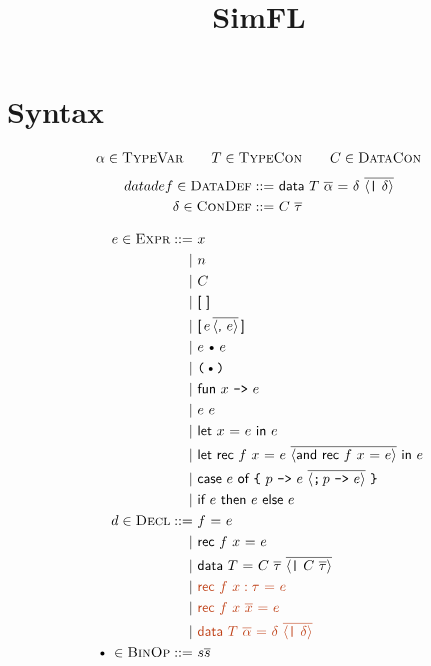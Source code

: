 \documentclass{article}
\title{SimFL}
\def\code#1{\textsf{#1}}
\def\por{\ | \ }
\def\binop{\, \text{\textbullet}\, }
\begin{document}
\maketitle
\section*{Syntax}

\begin{gather*}
\alpha \in \textsc{TypeVar}\qquad T \in \textsc{TypeCon}\qquad C \in \textsc{DataCon}
\end{gather*}
\begin{align*}
datadef\in \textsc{DataDef} ::= \ & \code{data $T$ $\overline{\alpha}$ = $\delta$ }\overline{\langle\texttt{|}\ \delta\rangle}\\
\delta \in \textsc{ConDef} ::= \ & \code{$C$ $\overline{\tau}$}
\end{align*}

\begin{align*}
e \in \textsc{Expr} ::= \ & x \\
\por & n \\
\por & C \\
\por & \code{[ ]}\\
\por & \code{[}\,e\,\overline{\langle \code{,}\ e\rangle}\,\code{]}\\
\por & e \binop e\\
\por & \texttt{($\binop$)}\\
\por & \code{fun $x$ \texttt{->} $e$}\\
\por & e \ e\\
\por & \code{let $x$ = $e$ in $e$}\\
\por & \code{let rec $f$ $x$ = $e$ }\overline{\langle\code{and rec $f$ $x$ = $e$}\rangle}\code{ in $e$}\\
\por & \code{case $e$ of }\texttt{\char`\{} \ \code{$p$ \texttt{->} $e$}\ \overline{\langle \texttt{;} \, \code{$p$ \texttt{->} $e$}\rangle} \ \texttt{\char`\}}\\
\por & \code{if $e$ then $e$ else $e$}\\
%
d \in \textsc{Decl} ::= \ & \code{$f$ = $e$}\\
\por & \code{rec $f$ $x$ = $e$}\\
\por & \code{data $T$ = }\code{$C$ $\overline{\tau}$ }\overline{\langle\texttt{|} \ C\ \overline{\tau}\rangle}\\
\por & {\color{Bittersweet}\code{rec $f$ $x:\tau$ = $e$}}\\
\por & {\color{Bittersweet}\code{rec $f$ $x$ $\overline{x}$ = $e$}}\\
\por & {\color{Bittersweet}\code{data $T$ $\overline{\alpha}$ = $\delta$ }\overline{\langle\texttt{|}\ \delta\rangle}}\\
%
\binop \in \textsc{BinOp} ::= \ & s\overline{s}
\end{align*}
\end{document}
